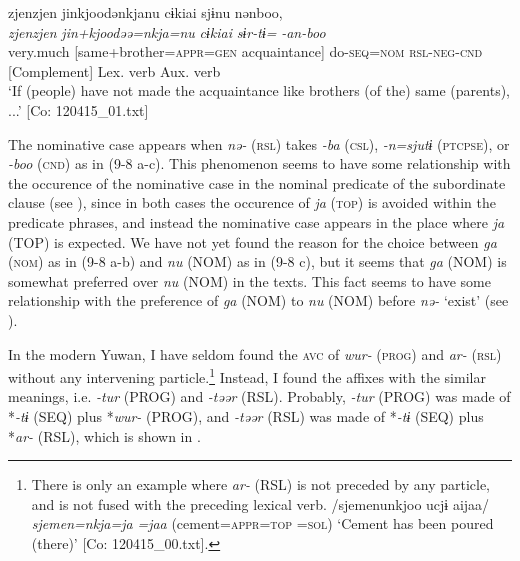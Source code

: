 \ex \label{ex:9.8c} %
     \gllll     zjenzjen  jinkjoodənkjanu  cɨkiai  sjɨnu                                           nənboo,\\
      \textit{zjenzjen}  \textit{jin+kjoodəə=nkja=nu}  \textit{cɨkiai}  \textit{sɨr-tɨ=}          \textit{-an-boo}\\
      very.much  [same+brother=\textsc{appr}=\textsc{gen}  acquaintance]  do-\textsc{seq}=\textsc{nom}                                  \textsc{rsl}-\textsc{neg}-\textsc{cnd}\\
       {} {[Complement]}  {}  {Lex. verb}       {Aux. verb}\\
      \glt       ‘If (people) have not made the acquaintance like brothers (of the) same (parents), ...’ [Co: 120415\_01.txt]
     \z
\z

The nominative case appears when \textit{nə-} (\textsc{rsl}) takes \textit{-ba} (\textsc{csl}), \textit{{}-n=sjutɨ} (\textsc{ptcpse}), or \textit{{}-boo} (\textsc{cnd}) as in (9-8 a-c). This phenomenon seems to have some relationship with the occurence of the nominative case in the nominal predicate of the subordinate clause (see ), since in both cases the occurence of \textit{ja} (\textsc{top}) is avoided within the predicate phrases, and instead the nominative case appears in the place where \textit{ja} (TOP) is expected. We have not yet found the reason for the choice between \textit{ga} (\textsc{nom}) as in (9-8 a-b) and \textit{nu} (NOM) as in (9-8 c), but it seems that \textit{ga} (NOM) is somewhat preferred over \textit{nu} (NOM) in the texts. This fact seems to have some relationship with the preference of \textit{ga} (NOM) to \textit{nu} (NOM) before \textit{nə-} ‘exist’ (see ).

In the modern Yuwan, I have seldom found the \textsc{avc} of \textit{wur-} (\textsc{prog}) and \textit{ar-} (\textsc{rsl}) without any intervening particle.\footnote{There is only an example where \textit{ar-} (RSL) is not preceded by any particle, and is not fused with the preceding lexical verb. /sjemenunkjoo ucjɨ aijaa/ \textit{sjemen=nkja=ja} \textit{} \textit{=jaa} (cement=\textsc{appr}=\textsc{top}  =\textsc{sol}) ‘Cement has been poured (there)’ [Co: 120415\_00.txt].} Instead, I found the affixes with the similar meanings, i.e. \textit{{}-tur} (PROG) and \textit{{}-təər} (RSL). Probably, \textit{{}-tur} (PROG) was made of *\textit{{}-tɨ} (SEQ) plus *\textit{wur-} (PROG), and \textit{{}-təər} (RSL) was made of *\textit{{}-tɨ} (SEQ) plus *\textit{ar-} (RSL), which is shown in .

